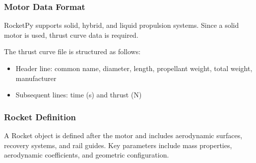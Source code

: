 \subsubsection*{Motor Data Format}

RocketPy supports solid, hybrid, and liquid propulsion systems. Since a solid motor is used, thrust curve data is required.

The thrust curve file is structured as follows:
\begin{itemize}
    \item Header line: common name, diameter, length, propellant weight, total weight, manufacturer
    \item Subsequent lines: time (s) and thrust (N)
\end{itemize}

\subsubsection*{Rocket Definition}

A Rocket object is defined after the motor and includes aerodynamic surfaces, recovery systems, and rail guides. Key parameters include mass properties, aerodynamic coefficients, and geometric configuration.